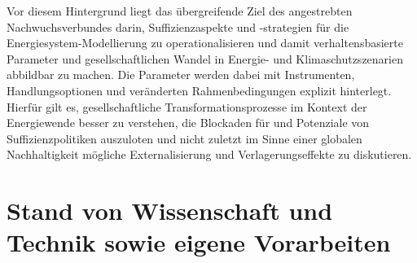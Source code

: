 \documentclass[a4paper,11pt,twoside]{scrartcl}
\begin{document}
Vor diesem Hintergrund liegt das übergreifende Ziel des angestrebten Nachwuchsverbundes darin, Suffizienzaspekte und -strategien für die Energiesystem-Modellierung zu operationalisieren und damit verhaltensbasierte Parameter und gesellschaftlichen Wandel in Energie- und Klimaschutzszenarien abbildbar zu machen. Die Parameter werden dabei mit Instrumenten, Handlungsoptionen und veränderten Rahmenbedingungen explizit hinterlegt. Hierfür gilt es, gesellschaftliche Transformationsprozesse im Kontext der Energiewende besser zu verstehen, die Blockaden für und Potenziale von Suffizienzpolitiken auszuloten und nicht zuletzt im Sinne einer globalen Nachhaltigkeit mögliche Externalisierung und Verlagerungseffekte zu diskutieren.

\section{Stand von Wissenschaft und Technik sowie eigene Vorarbeiten}
\label{sec:2}
\end{document}
